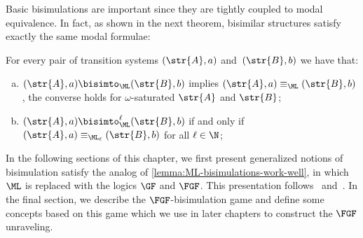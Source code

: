 \noindent
Basic bisimulations are important since they are tightly coupled to modal equivalence.
In fact, as shown in the next theorem, bisimilar structures satisfy exactly the same modal formulae:
\begin{lemma}\label{lemma:ML-bisimulations-work-well}
For every pair of transition systems $(\str{A}, a)$ and~$(\str{B}, b)$ we have that:
\begin{enumerate}[(a)]
\item $(\str{A}, a) \bisimto_{\ML} (\str{B}, b)$ implies $(\str{A}, a) \equiv_{\ML} (\str{B}, b)$, the converse holds for $\omega$-saturated $\str{A}$ and $\str{B}$;
\item $(\str{A}, a) \bisimto_{\ML}^{\ell} (\str{B}, b)$ if and only if $(\str{A}, a) \equiv_{\ML_\ell} (\str{B}, b)$ for all $\ell \in \N$;
\end{enumerate}
\end{lemma}
In the following sections of this chapter, we first present generalized notions of bisimulation satisfy the analog of \cref{lemma:ML-bisimulations-work-well}, in which $\ML$ is replaced with the logics $\GF$ and $\FGF$.
This presentation follows~\cite[Sec. 2.2.3]{Otto04} and~\cite[Sec. 2]{BednarczykJ22}.
In the final section, we describe the $\FGF$-bisimulation game and define some concepts based on this game which we use in later chapters to construct the $\FGF$ unraveling.

